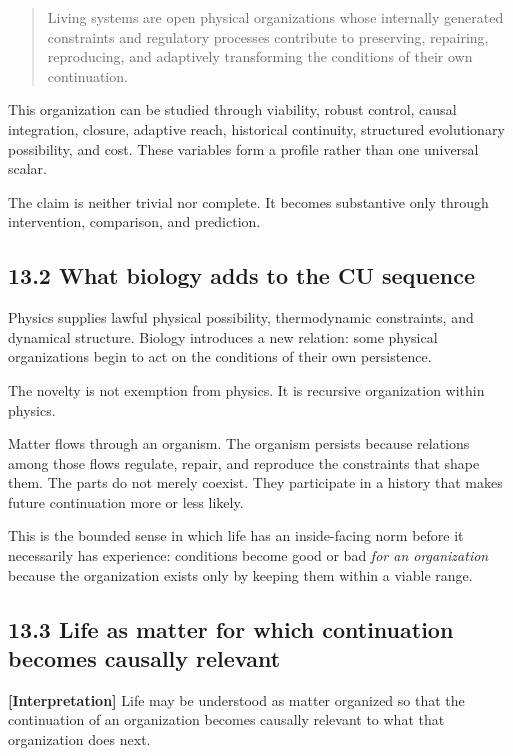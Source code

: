 \documentclass[
  11pt,
]{article}
\begin{document}
\begin{quote}
Living systems are open physical organizations whose internally
generated constraints and regulatory processes contribute to preserving,
repairing, reproducing, and adaptively transforming the conditions of
their own continuation.
\end{quote}

This organization can be studied through viability, robust control,
causal integration, closure, adaptive reach, historical continuity,
structured evolutionary possibility, and cost. These variables form a
profile rather than one universal scalar.

The claim is neither trivial nor complete. It becomes substantive only
through intervention, comparison, and prediction.

\subsection{13.2 What biology adds to the CU
sequence}\label{what-biology-adds-to-the-cu-sequence}

Physics supplies lawful physical possibility, thermodynamic constraints,
and dynamical structure. Biology introduces a new relation: some
physical organizations begin to act on the conditions of their own
persistence.

The novelty is not exemption from physics. It is recursive organization
within physics.

Matter flows through an organism. The organism persists because
relations among those flows regulate, repair, and reproduce the
constraints that shape them. The parts do not merely coexist. They
participate in a history that makes future continuation more or less
likely.

This is the bounded sense in which life has an inside-facing norm before
it necessarily has experience: conditions become good or bad \emph{for
an organization} because the organization exists only by keeping them
within a viable range.

\subsection{13.3 Life as matter for which continuation becomes causally
relevant}\label{life-as-matter-for-which-continuation-becomes-causally-relevant}

\textbf{{[}Interpretation{]}} Life may be understood as matter organized
so that the continuation of an organization becomes causally relevant to
what that organization does next.
\end{document}
